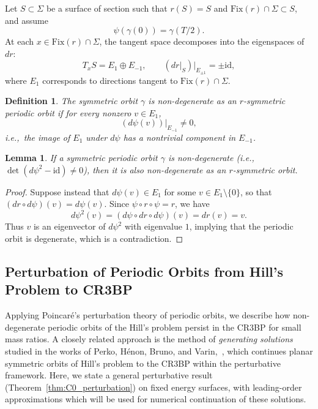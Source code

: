 \documentclass[pdflatex,sn-mathphys-ay]{sn-jnl}%
\theoremstyle{thmstyleone}%
\newtheorem{lemma}[theorem]{Lemma}%
\theoremstyle{thmstyletwo}%
\theoremstyle{thmstylethree}%
\newtheorem{definition}{Definition}%
\begin{document}
Let $S\subset \Sigma$ be a surface of section such that $r(S)=S$ and $\mathrm{Fix}(r)\cap \Sigma \subset S$, and assume
\[
\psi(\gamma(0)) = \gamma(T/2).
\]
At each $x \in \mathrm{Fix}(r)\cap \Sigma$, the tangent space decomposes into the eigenspaces of $dr$:
\[
T_x S = E_1 \oplus E_{-1}, \qquad \left(dr|_S\right)|_{E_{\pm 1}} = \pm \mathrm{id},
\]
where $E_1$ corresponds to directions tangent to $\mathrm{Fix}(r)\cap \Sigma$.

\begin{definition}
The symmetric orbit $\gamma$ is \emph{non-degenerate as an $r$-symmetric periodic orbit} if for every nonzero $v \in E_1$,
\[
(d\psi(v))|_{E_{-1}} \neq 0,
\]
i.e.,\ the image of $E_1$ under $d\psi$ has a nontrivial component in $E_{-1}$.
\end{definition}

\begin{lemma}
    \label{lem:symm-non-deg}
If a symmetric periodic orbit $\gamma$ is non-degenerate (i.e.,\ $\det(d\psi^2 - \mathrm{id}) \neq 0$), then it is also non-degenerate as an $r$-symmetric orbit.
\end{lemma}

\begin{proof}
Suppose instead that $d\psi(v) \in E_1$ for some $v \in E_1\setminus \{0\}$, so that $(dr\circ d\psi)(v) = d\psi(v)$. Since $\psi \circ r \circ \psi = r$, we have
\[
d\psi^2(v) = (d\psi \circ dr \circ d\psi)(v) = dr(v) = v.
\]
Thus $v$ is an eigenvector of $d\psi^2$ with eigenvalue $1$, implying that the periodic orbit is degenerate, which is a contradiction.
\end{proof}

\subsection{Perturbation of Periodic Orbits from Hill's Problem to CR3BP}
\label{sec:perturbation}

Applying Poincar\'e's perturbation theory of periodic orbits, we describe how non-degenerate periodic orbits of the Hill's problem persist in the CR3BP for small mass ratios. A closely related approach is the method of \emph{generating solutions} studied in the works of Perko, H\'enon, Bruno, and Varin,~\cite{perko_periodic_1983,henon_generating_1997,bruno-varin_periodic_2007}, which continues planar symmetric orbits of Hill's problem to the CR3BP within the perturbative framework.
Here, we state a general perturbative result (Theorem~\ref{thm:C0_perturbation}) on fixed energy surfaces, with leading-order approximations which will be used for numerical continuation of these solutions.
\end{document}
